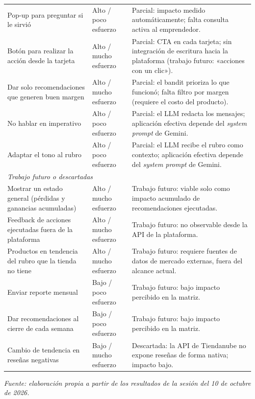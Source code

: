 \begin{table}[ht]
\begin{tabular}{p{5.5cm} p{3cm} p{5.5cm}}
Pop-up para preguntar si le sirvió & Alto / poco esfuerzo & Parcial: impacto medido automáticamente; falta consulta activa al emprendedor. \\
Botón para realizar la acción desde la tarjeta & Alto / mucho esfuerzo & Parcial: CTA en cada tarjeta; sin integración de escritura hacia la plataforma (trabajo futuro: «acciones con un clic»). \\
Dar solo recomendaciones que generen buen margen & Alto / mucho esfuerzo & Parcial: el bandit prioriza lo que funcionó; falta filtro por margen (requiere el costo del producto). \\
No hablar en imperativo & Alto / poco esfuerzo & Parcial: el LLM redacta los mensajes; aplicación efectiva depende del \emph{system prompt} de Gemini. \\
Adaptar el tono al rubro & Alto / poco esfuerzo & Parcial: el LLM recibe el rubro como contexto; aplicación efectiva depende del \emph{system prompt} de Gemini. \\
\hline
\multicolumn{3}{l}{\textit{Trabajo futuro o descartadas}} \\
\hline
Mostrar un estado general (pérdidas y ganancias acumuladas) & Alto / mucho esfuerzo & Trabajo futuro: viable solo como impacto acumulado de recomendaciones ejecutadas. \\
Feedback de acciones ejecutadas fuera de la plataforma & Alto / mucho esfuerzo & Trabajo futuro: no observable desde la API de la plataforma. \\
Productos en tendencia del rubro que la tienda no tiene & Alto / mucho esfuerzo & Trabajo futuro: requiere fuentes de datos de mercado externas, fuera del alcance actual. \\
Enviar reporte mensual & Bajo / poco esfuerzo & Trabajo futuro: bajo impacto percibido en la matriz. \\
Dar recomendaciones al cierre de cada semana & Bajo / poco esfuerzo & Trabajo futuro: bajo impacto percibido en la matriz. \\
Cambio de tendencia en reseñas negativas & Bajo / mucho esfuerzo & Descartada: la API de Tiendanube no expone reseñas de forma nativa; impacto bajo. \\
\hline
\end{tabular}
\end{table}

\noindent\textit{Fuente: elaboración propia a partir de los resultados de la sesión del 10 de octubre de 2026.}

